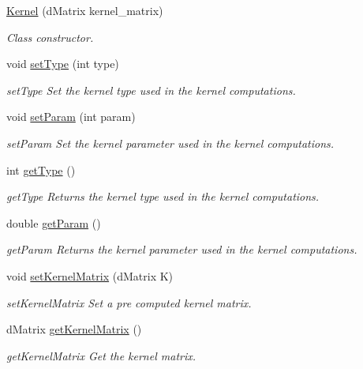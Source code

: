 \begin{DoxyCompactItemize}
\item 
\hyperlink{class_kernel_adf23c1567adb8ddb5757931587320871}{Kernel} (d\+Matrix kernel\+\_\+matrix)
\begin{DoxyCompactList}\small\item\em Class constructor. \end{DoxyCompactList}\item 
void \hyperlink{class_kernel_ad01e209470accf44ea240078f39fb127}{set\+Type} (int type)
\begin{DoxyCompactList}\small\item\em set\+Type Set the kernel type used in the kernel computations. \end{DoxyCompactList}\item 
void \hyperlink{class_kernel_a4fe711ebdbc168be1733fbb8aea6cf92}{set\+Param} (int param)
\begin{DoxyCompactList}\small\item\em set\+Param Set the kernel parameter used in the kernel computations. \end{DoxyCompactList}\item 
int \hyperlink{class_kernel_a5a2cb0fce0eda6c67a2325f6c8958da8}{get\+Type} ()
\begin{DoxyCompactList}\small\item\em get\+Type Returns the kernel type used in the kernel computations. \end{DoxyCompactList}\item 
double \hyperlink{class_kernel_a838e2cc5018fa702e59c52a3bf8ef813}{get\+Param} ()
\begin{DoxyCompactList}\small\item\em get\+Param Returns the kernel parameter used in the kernel computations. \end{DoxyCompactList}\item 
void \hyperlink{class_kernel_a3801cee0d86f25f1500d202f43a84b65}{set\+Kernel\+Matrix} (d\+Matrix K)
\begin{DoxyCompactList}\small\item\em set\+Kernel\+Matrix Set a pre computed kernel matrix. \end{DoxyCompactList}\item 
d\+Matrix \hyperlink{class_kernel_a5e398c63fee5f0e30b6dfb735c75e41a}{get\+Kernel\+Matrix} ()
\begin{DoxyCompactList}\small\item\em get\+Kernel\+Matrix Get the kernel matrix. \end{DoxyCompactList}\item 

\end{DoxyCompactItemize}
